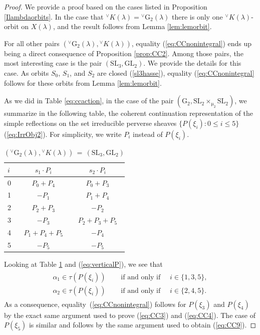 \documentclass[a4paper, 11pt]{article}
\begin{document}
\begin{proof}
We provide a proof based on the cases listed in Proposition
\ref{Ilambdaorbits}.  In the case that
${}^{\vee}K(\lambda)={}^{\vee}\mathrm{G}_{2}(\lambda)$ there is
only one ${}^{\vee}K(\lambda)$-orbit on $X(\lambda)$, and the result follows
from Lemma \ref{lem:lemorbit}.   

For all other pairs
$({}^{\vee}\mathrm{G}_{2}(\lambda),{}^{\vee}K(\lambda))$, equality
(\ref{eq:CCnonintegral}) ends up being a direct consequence of Proposition
\ref{prop:CC2}.   Among those pairs, the most interesting case is
the pair $(\mathrm{SL}_3,\mathrm{GL}_2)$.  We  provide the details for
this case.  As orbits $S_0$, $S_1$, and $S_2$ are closed
(\ref{sl3hasse}), equality 
(\ref{eq:CCnonintegral} follows for these orbits from 
Lemma \ref{lem:lemorbit}. 

As we did in Table \ref{eq:ccaction}, in the case of the pair
$(\mathrm{G}_{2},\mathrm{SL}_2\times_{\upmu_2}\mathrm{SL}_2)$, we
summarize in the following table, the coherent continuation
representation of the simple reflections on the set irreducible
perverse sheaves $\{P(\xi_i):0\leq i\leq 5\}$ (\ref{eq:IrrObj2}). For
simplicity, we write $P_i$ instead of $P(\xi_i)$.  

\begin{table}[!htb]
\centering   
    \begin{minipage}{.5\linewidth}
      \caption{$\left({}^{\vee}\mathrm{G}_{2}(\lambda),{}^{\vee}K(\lambda)\right)\, =\, (\mathrm{SL}_3,\mathrm{GL}_2)$      
      }\label{eq:ccactionSL3}
      \centering
      \begin{tabular}{ | l | c | c | }
\hline 
 $i$ & $s_{1}\cdot P_i$ & $s_{2}\cdot P_i$ \\ \hline \hline		
   0 & $P_0+P_4$ & $P_0+P_3$\\	\hline
   1 & $-P_1$ & $P_1+P_4$ \\ \hline
   2 & $P_2+P_3$ & $-P_2$ \\ \hline
   3 & $-P_3$ & $P_2+P_3+P_5$  \\ \hline
   4 & $P_1+P_4+P_5$ & $-P_4$\\ \hline
   5 & $-P_5$ & $-P_5$\\ 
 \hline  
\end{tabular}
    \end{minipage}%
\end{table}


Looking at Table \ref{eq:ccactionSL3} and
(\ref{eq:verticalP}), we see that 
\begin{align*}
\begin{aligned}
\alpha_1\in \tau(P(\xi_i))&\quad\text{ if and only if }\quad i\in\{1,3,5\},\\
\alpha_2\in \tau(P(\xi_i))&\quad\text{ if and only if }\quad i\in\{2,4,5\}.
\end{aligned}
\end{align*}
As a consequence, equality~(\ref{eq:CCnonintegral}) follows  for
$P(\xi_3)$ and $P(\xi_4)$ by the exact same argument used to prove
(\ref{eq:CC3}) and (\ref{eq:CC4}). 
The case of $P(\xi_5)$ is similar and follows by the same argument
used to obtain  (\ref{eq:CC9}).


\end{proof}
\end{document}
